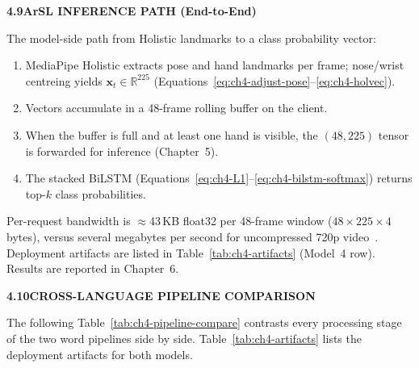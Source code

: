\noindent\textbf{4.9\quad ArSL INFERENCE PATH (End-to-End)}\par
{}
\vspace{0.4cm}

\noindent The model-side path from Holistic landmarks to a class probability vector:
\begin{enumerate}
\item MediaPipe Holistic extracts pose and hand landmarks per frame; nose/wrist centreing yields $\mathbf{x}_t \in \mathbb{R}^{225}$ (Equations~\eqref{eq:ch4-adjust-pose}--\eqref{eq:ch4-holvec}).
\item Vectors accumulate in a 48-frame rolling buffer on the client.
\item When the buffer is full and at least one hand is visible, the $(48, 225)$ tensor is forwarded for inference (Chapter~5).
\item The stacked BiLSTM (Equations~\eqref{eq:ch4-L1}--\eqref{eq:ch4-bilstm-softmax}) returns top-$k$ class probabilities.
\end{enumerate}
\vspace{0.3cm}

\noindent Per-request bandwidth is $\approx$43\,KB float32 per 48-frame window ($48 \times 225 \times 4$ bytes), versus several megabytes per second for uncompressed 720p video~\cite{rfc6455}. Deployment artifacts are listed in Table~\ref{tab:ch4-artifacts} (Model~4 row). Results are reported in Chapter~6.\par\vspace{0.6cm}

\clearpage
\noindent\textbf{4.10\quad CROSS-LANGUAGE PIPELINE COMPARISON}\par
{}
\vspace{0.4cm}

\noindent The following Table~\ref{tab:ch4-pipeline-compare} contrasts every processing stage of the two word pipelines side by side. Table~\ref{tab:ch4-artifacts} lists the deployment artifacts for both models.\par\vspace{0.2cm}

